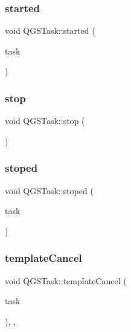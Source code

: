 \subsubsection{\texorpdfstring{started}{started}}
{\footnotesize\ttfamily void Q\+G\+S\+Task\+::started (\begin{DoxyParamCaption}\item[{\mbox{\hyperlink{class_q_g_s_task}{Q\+G\+S\+Task}} $\ast$}]{task }\end{DoxyParamCaption})\hspace{0.3cm}{\ttfamily [signal]}}

\mbox{\label{class_q_g_s_task_a34c4add1a5ab89a6054a7b00d376b2ef}} 
\subsubsection{\texorpdfstring{stop}{stop}}
{\footnotesize\ttfamily void Q\+G\+S\+Task\+::stop (\begin{DoxyParamCaption}{ }\end{DoxyParamCaption})\hspace{0.3cm}{\ttfamily [slot]}}

\mbox{\label{class_q_g_s_task_ab87f33f5aab99ded7d460a014a862692}} 
\subsubsection{\texorpdfstring{stoped}{stoped}}
{\footnotesize\ttfamily void Q\+G\+S\+Task\+::stoped (\begin{DoxyParamCaption}\item[{\mbox{\hyperlink{class_q_g_s_task}{Q\+G\+S\+Task}} $\ast$}]{task }\end{DoxyParamCaption})\hspace{0.3cm}{\ttfamily [signal]}}

\mbox{\label{class_q_g_s_task_ade5272b678776b00e47e2d88a2efa7c8}} 
\subsubsection{\texorpdfstring{template\+Cancel}{templateCancel}}
{\footnotesize\ttfamily void Q\+G\+S\+Task\+::template\+Cancel (\begin{DoxyParamCaption}\item[{\mbox{\hyperlink{class_q_g_s_task}{Q\+G\+S\+Task}} $\ast$}]{task }\end{DoxyParamCaption})\hspace{0.3cm}{\ttfamily [protected]}, {\ttfamily [virtual]}, {\ttfamily [slot]}}

